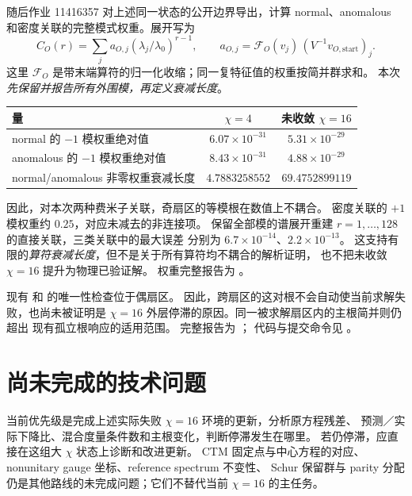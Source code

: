 \documentclass[11pt]{article}
\begin{document}
随后作业 11416357 对上述同一状态的公开边界导出，计算 normal、anomalous
和密度关联的完整模式权重。展开写为
\begin{equation}
 C_O(r)=\sum_j a_{O,j}(\lambda_j/\lambda_0)^{r-1},
 \qquad
 a_{O,j}=\mathcal F_O(v_j)\,(V^{-1}v_{O,\mathrm{start}})_j.
\end{equation}
这里 $\mathcal F_O$ 是带末端算符的归一化收缩；同一复特征值的权重按简并群求和。
本次\emph{先保留并报告所有外围模，再定义衰减长度}。
\begin{center}\small
\begin{tabular}{lcc}
\hline
量 & $\chi=4$ & 未收敛 $\chi=16$\\
\hline
normal 的 $-1$ 模权重绝对值 & $6.07\times10^{-31}$ & $5.31\times10^{-29}$\\
anomalous 的 $-1$ 模权重绝对值 & $8.43\times10^{-31}$ & $4.88\times10^{-29}$\\
normal/anomalous 非零权重衰减长度 & $4.7883258552$ & $69.4752899119$\\
\hline
\end{tabular}
\end{center}
因此，对本次两种费米子关联，奇扇区的等模根在数值上不耦合。
密度关联的 $+1$ 模权重约 $0.25$，对应未减去的非连接项。
保留全部模的谱展开重建 $r=1,\ldots,128$ 的直接关联，三类关联中的最大误差
分别为 $6.7\times10^{-14}$、$2.2\times10^{-13}$。
这支持有限的\emph{算符衰减长度}，但不是关于所有算符均不耦合的解析证明，
也不把未收敛 $\chi=16$ 提升为物理已验证解。
权重完整报告为
。

现有  和  的唯一性检查位于偶扇区。
因此，跨扇区的这对根不会自动使当前求解失败，也尚未被证明是
$\chi=16$ 外层停滞的原因。同一被求解扇区内的主根简并则仍超出
现有孤立根响应的适用范围。
完整报告为 ；
代码与提交命令见
。

\section{尚未完成的技术问题}
当前优先级是完成上述实际失败 $\chi=16$ 环境的更新，分析原方程残差、
预测／实际下降比、混合度量条件数和主根变化，判断停滞发生在哪里。
若仍停滞，应直接在这组大 $\chi$ 状态上诊断和改进更新。
CTM 固定点与中心方程的对应、nonunitary gauge 坐标、reference spectrum 不变性、
Schur 保留群与 parity 分配仍是其他路线的未完成问题；它们不替代当前 $\chi=16$ 的主任务。
\end{document}
